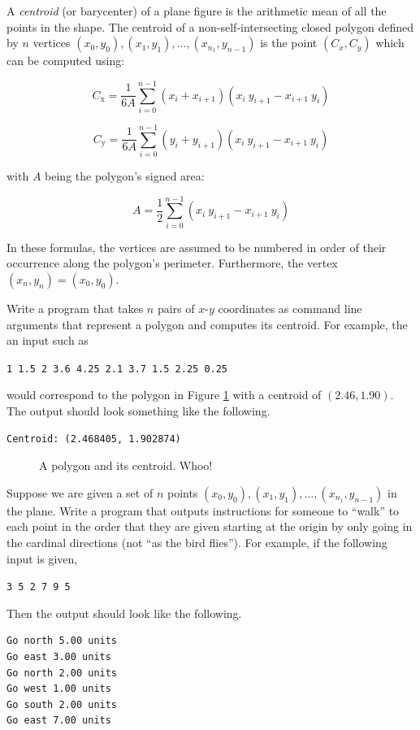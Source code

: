 \begin{exer}
A \emph{centroid} (or barycenter) of a plane figure is the arithmetic mean of all 
the points in the shape.  The centroid of a non-self-intersecting closed polygon defined by 
$n$ vertices $(x_0, y_0), (x_1, y_1), \ldots, (x_{n_1}, y_{n-1})$ is the point $(C_x, C_y)$
which can be computed using: 

$$C_{\mathrm x} = \frac{1}{6A}\sum_{i=0}^{n-1}(x_i+x_{i+1})(x_i\ y_{i+1} - x_{i+1}\ y_i)$$

$$C_{\mathrm y} = \frac{1}{6A}\sum_{i=0}^{n-1}(y_i+y_{i+1})(x_i\ y_{i+1} - x_{i+1}\ y_i)$$

with $A$ being the polygon's signed area: 

$$A = \frac{1}{2}\sum_{i=0}^{n-1} (x_i\ y_{i+1} - x_{i+1}\ y_i)$$

In these formulas, the vertices are assumed to be numbered in order of their occurrence 
along the polygon's perimeter. Furthermore, the vertex $(x_n, y_n) = (x_0, y_0)$.

Write a program that takes $n$ pairs of $x$-$y$ coordinates as command line arguments
that represent a polygon and computes its centroid.  For example, the an input such as

\texttt{1 1.5 2 3.6 4.25 2.1 3.7 1.5 2.25 0.25}

would correspond to the polygon in Figure \ref{fig:polygon} with a centroid of 
$(2.46, 1.90)$. The output should look something like the following.

\begin{verbatim}
Centroid: (2.468405, 1.902874)
\end{verbatim}

\begin{figure}
\centering

\caption{A polygon and its centroid.  Whoo!}
\label{fig:polygon}
\end{figure}
\end{exer}

\begin{exer}
Suppose we are given a set of $n$ points $(x_0, y_0), (x_1, y_1), \ldots, (x_{n_1}, y_{n-1})$
in the plane.  Write a program that outputs instructions for someone to ``walk''
to each point in the order that they are given starting at the origin by only 
going in the cardinal directions (not ``as the bird flies'').  For example, if the following input is given, 

\texttt{3 5 2 7 9 5}

Then the output should look like the following.

\begin{verbatim}
Go north 5.00 units
Go east 3.00 units
Go north 2.00 units
Go west 1.00 units
Go south 2.00 units
Go east 7.00 units
\end{verbatim}
\end{exer}

